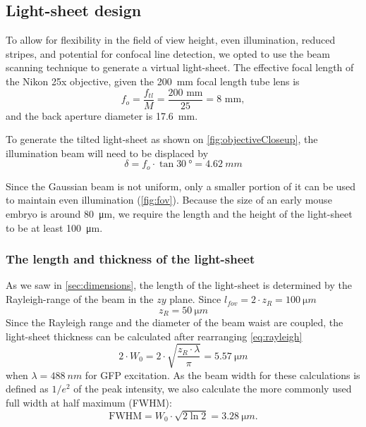   \subsection{Light-sheet design}
    \label{sec:ls-design}
    To allow for flexibility in the field of view height, even illumination, reduced stripes, and potential for confocal line detection, we opted to use the beam scanning technique to generate a virtual light-sheet. The effective focal length of the Nikon 25x objective, given the \SI{200}{mm} focal length tube lens is
    \begin{equation}
    f_{o} = \frac{f_{tl}}{M} = \frac{200\text{  mm}}{25} = 8 \text{  mm},
    \end{equation}
    and the back aperture diameter is \SI{17.6}{mm}.
    
    To generate the tilted light-sheet as shown on \autoref{fig:objectiveCloseup}, the illumination beam will need to be displaced by
    \begin{equation}
      \delta = f_o \cdot \tan \SI{30}{\degree} = \SI{4.62}{mm}
    \end{equation}
    
    Since the Gaussian beam is not uniform, only a smaller portion of it can be used to maintain even illumination (\autoref{fig:fov}). Because the size of an early mouse embryo is around \SI{80}{\micro m}, we require the length and the height of the light-sheet to be at least \SI{100}{\micro m}.
    

    \subsubsection{The length and thickness of the light-sheet}
    
      As we saw in \autoref{sec:dimensions}, the length of the light-sheet is determined by the Rayleigh-range of the beam in the $zy$ plane. Since $l_{fov}=2\cdot z_{R}=\SI{100}{\micro m}$
      \begin{equation}
        z_{R}=\SI{50}{\micro m}
      \end{equation}
      Since the Rayleigh range and the diameter of the beam waist are coupled, the light-sheet thickness can be calculated after rearranging \autoref{eq:rayleigh}
      \begin{equation}
        2\cdot W_{0} = 2\cdot \sqrt{\frac{z_R \cdot \lambda}{\pi}} = \SI{5.57}{\micro m}
      \end{equation}
      when $\lambda=\SI{488}{nm}$ for GFP excitation. As the beam width for these calculations is defined as $1/e^2$ of the peak intensity, we also calculate the more commonly used full width at half maximum (FWHM):
      \begin{equation}
        \mathrm{FWHM} = W_0 \cdot \sqrt{2 \ln 2} = \SI{3.28}{\micro m}.
      \end{equation}
      
